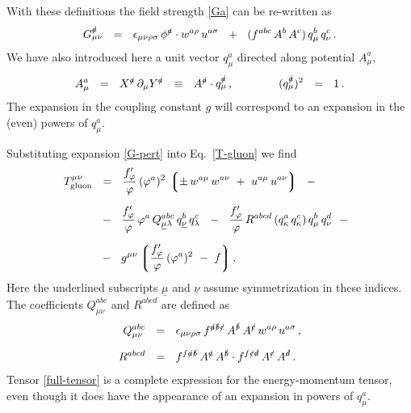 \documentclass[epsfig,12pt]{article}
\def\beq{\begin{equation}}
\def\eeq{\end{equation}}
\newcommand{\p}{\partial}
\newcommand{\lgr}{\left\lgroup}
\newcommand{\rgr}{\right\rgroup}
\begin{document}
	With these definitions the field strength \eqref{Ga} can be re-written as
\beq
\label{G-pert}
	G_{\mu\nu}^\slashed a    ~~=~~    \epsilon_{\mu\nu\rho\sigma}\, \phi^\slashed{a} \cdot w^{a\rho}\, u^{a\sigma}
				 ~~+~~  ( f^{abc}\, A^b\, A^c )\, q_\mu^b\, q_\nu^c\,.
\eeq
	We have also introduced here a unit vector $ q^a_\mu $ directed along potential $ A_\mu^a $,
\beq
	A_\mu^a    ~~=~~    X^\slashed a\, \p_\mu Y^\slashed a    ~~\equiv~~    A^\slashed a \cdot q_\mu^\slashed a\,,
	\qquad\qquad
	( q_\mu^\slashed a )^2    ~~=~~    1\,.
\eeq
	The expansion in the coupling constant $ g $ will correspond to an expansion in the (even) powers of $ q_\mu^a $.

	Substituting expansion \eqref{G-pert} into Eq.~\eqref{T-gluon} we find
\begin{align}
%
\notag
	T_\text{gluon}^{\mu\nu}    & ~~=~~    \frac{f^\prime_\varphi}{\varphi}\, (\varphi^a)^2\,
					      \lgr \pm\, w^{a\mu}\, w^{a\nu}  ~+~  u^{a\mu}\, u^{a\nu} \rgr    ~~-~~
	\\[2mm]
%
\label{full-tensor}
				   & ~~-~~  \frac{f^\prime_\varphi}{\varphi}\, \varphi^a\,
					    Q^{abc}_{\underline{\mu}\lambda}\, q^b_{\underline{\nu}}\, q^c_\lambda
				     ~~-~~  \frac{f^\prime_\varphi}{\varphi}\,
					    R^{abcd}\, ( q^a_\kappa\, q^c_\kappa )\, q^b_\mu\, q^d_\nu    ~~-~~
	\\[2mm]
%
\notag
				   & ~~-~~  g^{\mu\nu}
					    \lgr \frac{f^\prime_\varphi}{\varphi}\, (\varphi^a)^2  ~-~  f \rgr .
\end{align}
	Here the underlined subscripts $ \underline{\mu} $ and $ \underline{\nu} $ assume symmetrization
	in these indices.
	The coefficients $ Q^{abc}_{\mu\nu} $ and $ R^{abcd} $ are defined as
\begin{align*}
%
	Q^{abc}_{\mu\nu}    & ~~=~~    \epsilon_{\mu\nu\rho\sigma}\,
				       f^{\slashed a\slashed b\slashed c}\, A^\slashed{b}\, A^\slashed{c}\,
				       w^{a\rho}\, u^{a\sigma}\,,
	\\[2mm]
%
	R^{abcd}    & ~~=~~    f^{f\slashed a\slashed b}\, A^\slashed{a}\, A^\slashed{b} \cdot
			       f^{f\slashed c\slashed d}\, A^\slashed{c}\, A^\slashed{d}\,.
\end{align*}
	Tensor \eqref{full-tensor} is a complete expression for the energy-momentum tensor,
	even though it does have the appearance of an expansion in powers of $ q^a_\mu $.
\end{document}
